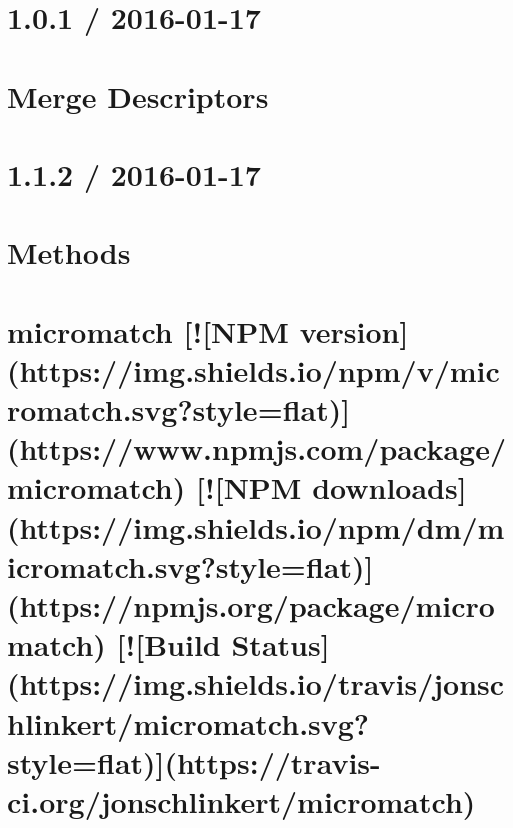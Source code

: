 \documentclass[twoside]{book}
\newcommand{\+}{\discretionary{\mbox{\scriptsize$\hookleftarrow$}}{}{}}
\begin{document}
\chapter{1.0.1 / 2016-\/01-\/17}
\label{md__c_1_workspace_demo_src_main_script_node_modules_merge-descriptors__h_i_s_t_o_r_y}

\chapter{Merge Descriptors}
\label{md__c_1_workspace_demo_src_main_script_node_modules_merge-descriptors__r_e_a_d_m_e}

\chapter{1.1.2 / 2016-\/01-\/17}
\label{md__c_1_workspace_demo_src_main_script_node_modules_methods__h_i_s_t_o_r_y}

\chapter{Methods}
\label{md__c_1_workspace_demo_src_main_script_node_modules_methods__r_e_a_d_m_e}

\chapter{micromatch \mbox{[}!\mbox{[}N\+PM version\mbox{]}(https\+://img.shields.\+io/npm/v/micromatch.svg?style=flat)\mbox{]}(https\+://www.npmjs.\+com/package/micromatch) \mbox{[}!\mbox{[}N\+PM downloads\mbox{]}(https\+://img.shields.\+io/npm/dm/micromatch.svg?style=flat)\mbox{]}(https\+://npmjs.org/package/micromatch) \mbox{[}!\mbox{[}Build Status\mbox{]}(https\+://img.shields.\+io/travis/jonschlinkert/micromatch.svg?style=flat)\mbox{]}(https\+://travis-\/ci.org/jonschlinkert/micromatch)}
\label{md__c_1_workspace_demo_src_main_script_node_modules_micromatch__r_e_a_d_m_e}

\end{document}
